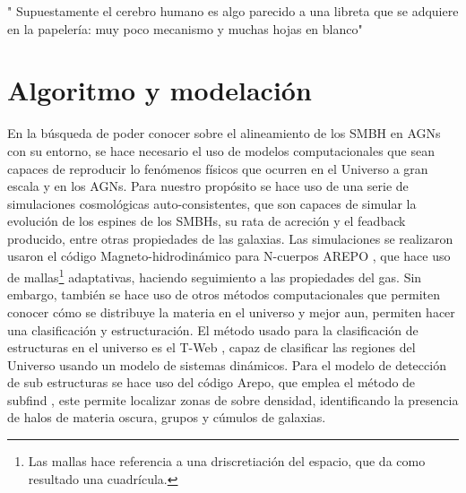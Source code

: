 \begin{savequote}[50mm]
"
Supuestamente el cerebro humano es algo parecido a una libreta que se adquiere en la papelería: muy poco mecanismo y muchas hojas en blanco"
\end{savequote}


\chapter{Algoritmo y modelación}
\label{cha: Algoritmo y modelacion}

En la búsqueda de poder conocer sobre el alineamiento de los SMBH en AGNs con su entorno, se hace necesario el uso de modelos computacionales que sean capaces de reproducir lo fenómenos físicos que ocurren en el Universo a gran escala y en los AGNs. Para nuestro propósito se hace uso de una serie de simulaciones cosmológicas auto-consistentes, que son capaces de simular la evolución de los espines de los SMBHs, su rata de acreción y el feadback producido,  entre otras propiedades de las galaxias. Las simulaciones se realizaron usaron el código Magneto-hidrodinámico para N-cuerpos AREPO \cite{springel2010}, que hace uso de mallas\footnote{Las mallas hace referencia a una driscretiación del espacio, que da como resultado una cuadrícula.} adaptativas, 
haciendo seguimiento a las propiedades del gas. Sin embargo, también se hace uso de otros métodos computacionales que permiten conocer cómo se distribuye la materia en el universo y mejor aun, permiten hacer una clasificación y estructuración. El método usado para la clasificación de estructuras en el universo es el  T-Web \cite{hahn2007}, capaz de clasificar las regiones del Universo usando un modelo de sistemas dinámicos. Para el modelo de detección de sub estructuras se hace uso del código Arepo, que emplea el método de subfind \cite{springel2018}, este permite localizar zonas de sobre densidad, identificando la presencia de halos de materia oscura, grupos y cúmulos de galaxias. 

